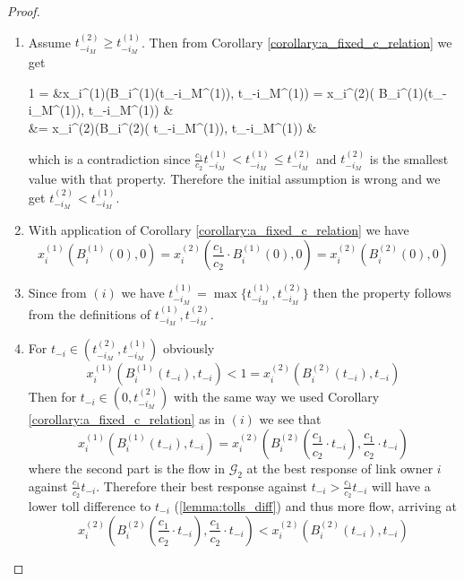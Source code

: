 \documentclass[10pt,a4paper]{book}
\newcommand{\Gm}{\mathcal{G}}
\theoremstyle{definition}
\theoremstyle{comment}
\begin{document}
\begin{proof}
	$ $
	\begin{enumerate}[$(i)$]
		\item Assume $t_{-i_M}^{(2)} \ge t_{-i_M}^{(1)}$.
		Then from Corollary \ref{corollary:a_fixed_c_relation} we get
		\begin{flalign*}
			1 = &x_i^{(1)}(B_i^{(1)}(t_{-i_M}^{(1)}), t_{-i_M}^{(1)}) = x_i^{(2)}\left(  \cdot B_i^{(1)}(t_{-i_M}^{(1)}),  \cdot t_{-i_M}^{(1)}\right) & \\
			&= x_i^{(2)}\left(B_i^{(2)}\left( \cdot t_{-i_M}^{(1)}\right),  \cdot t_{-i_M}^{(1)}\right) &
		\end{flalign*}
		which is a contradiction since $\frac{c_1}{c_2} t_{-i_M}^{(1)} < t_{-i_M}^{(1)} \le t_{-i_M}^{(2)}$ and $t_{-i_M}^{(2)}$ is the smallest value with that property.
		Therefore the initial assumption is wrong and we get $t_{-i_M}^{(2)} < t_{-i_M}^{(1)}$.
		\item With application of Corollary \ref{corollary:a_fixed_c_relation} we have
		\[
			x_i^{(1)}(B_i^{(1)}(0), 0) = x_i^{(2)}\left(\frac{c_1}{c_2} \cdot B_i^{(1)}(0), 0\right) = x_i^{(2)}(B_i^{(2)}(0), 0)
		\]
		\item Since from $(i)$ we have $t_{-i_M}^{(1)} = \max\{t_{-i_M}^{(1)}, t_{-i_M}^{(2)}\}$ then the property follows from the definitions of $t_{-i_M}^{(1)}, t_{-i_M}^{(2)}$.
		\item For $t_{-i} \in (t_{-i_M}^{(2)}, t_{-i_M}^{(1)})$ obviously
		\[
			x_i^{(1)}(B_i^{(1)}(t_{-i}), t_{-i}) < 1 = x_i^{(2)}(B_i^{(2)}(t_{-i}), t_{-i})
		\]
		Then for $t_{-i} \in (0, t_{-i_M}^{(2)})$ with the same way we used Corollary \ref{corollary:a_fixed_c_relation} as in $(i)$ we see that
		\[
			x_i^{(1)}(B_i^{(1)}(t_{-i}), t_{-i}) = x_i^{(2)}\left(B_i^{(2)}\left(\frac{c_1}{c_2} \cdot t_{-i}\right), \frac{c_1}{c_2} \cdot t_{-i}\right)
		\]
		where the second part is the flow in $\Gm_2$ at the best response of link owner $i$ against $\frac{c_1}{c_2} t_{-i}$.
		Therefore their best response against $t_{-i} > \frac{c_1}{c_2} t_{-i}$ will have a lower toll difference to $t_{-i}$ (\ref{lemma:tolls_diff}) and thus more flow, arriving at
		\[
			x_i^{(2)}\left(B_i^{(2)}\left(\frac{c_1}{c_2} \cdot t_{-i}\right), \frac{c_1}{c_2} \cdot t_{-i}\right) < x_i^{(2)}(B_i^{(2)}(t_{-i}), t_{-i})
		\]
	\end{enumerate}
\end{proof}
\end{document}
